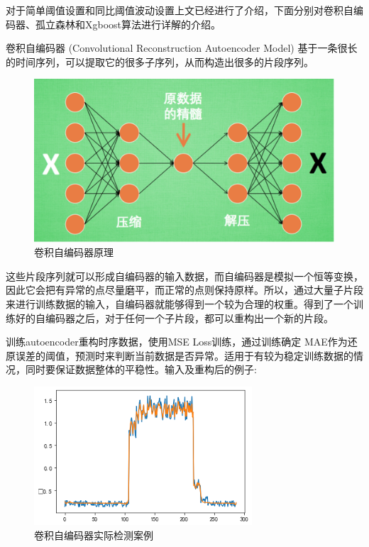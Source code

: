 对于简单阈值设置和同比阈值波动设置上文已经进行了介绍，下面分别对卷积自编码器、孤立森林和Xgboost算法进行详解的介绍。

卷积自编码器 (Convolutional Reconstruction Autoencoder Model)\cite{} 基于一条很长的时间序列，可以提取它的很多子序列，从而构造出很多的片段序列。
  \begin{figure}[h!]
  \centering
  \includegraphics[scale=0.9]{figure/chapter4/卷积自编码器原理.png}
  \caption{卷积自编码器原理}\label{juanjiyuanli}
\end{figure}

这些片段序列就可以形成自编码器的输入数据，而自编码器是模拟一个恒等变换，因此它会把有异常的点尽量磨平，而正常的点则保持原样。所以，通过大量子片段来进行训练数据的输入，自编码器就能够得到一个较为合理的权重。得到了一个训练好的自编码器之后，对于任何一个子片段，都可以重构出一个新的片段。

训练autoencoder重构时序数据，使用MSE Loss训练，通过训练确定 MAE作为还原误差的阈值，预测时来判断当前数据是否异常。适用于有较为稳定训练数据的情况，同时要保证数据整体的平稳性。输入及重构后的例子:

  \begin{figure}[htbp]
  \centering
  \includegraphics[scale=0.9]{figure/chapter4/卷积自编码器实际检测案例.png}
  \caption{卷积自编码器实际检测案例}\label{juanjiyuanlianli}
\end{figure}


